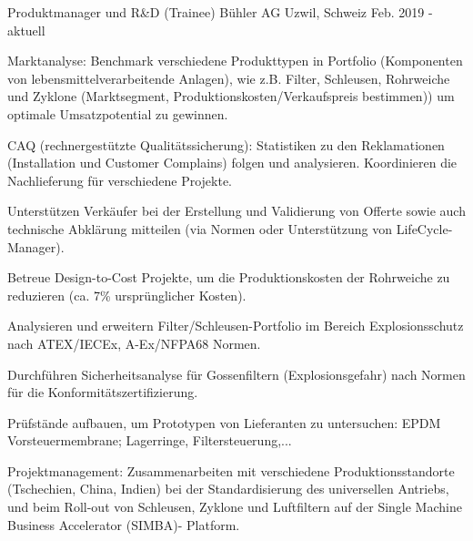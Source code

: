 

\begin{cventries}

\cventry
	{Produktmanager und R\&D (Trainee)} %
	{Bühler AG} %
	{Uzwil, Schweiz} %
	{Feb. 2019 - aktuell} %
	{
		\begin{cvitems} %
			\item {Marktanalyse: Benchmark verschiedene Produkttypen in Portfolio (Komponenten von lebensmittelverarbeitende Anlagen), wie z.B. Filter, Schleusen, Rohrweiche und Zyklone (Marktsegment, Produktionskosten/Verkaufspreis bestimmen)) um optimale Umsatzpotential zu gewinnen.}
			\item {CAQ (rechnergestützte Qualitätssicherung): Statistiken zu den Reklamationen (Installation und Customer Complains) folgen und analysieren. Koordinieren die Nachlieferung für verschiedene Projekte.}
			\item {Unterstützen Verkäufer bei der Erstellung und Validierung von Offerte sowie auch technische Abklärung mitteilen (via Normen oder Unterstützung von LifeCycle-Manager).}
			\item {Betreue Design-to-Cost Projekte, um die Produktionskosten der Rohrweiche zu reduzieren (ca. 7\% ursprünglicher Kosten).}
			\item {Analysieren und erweitern Filter/Schleusen-Portfolio im Bereich Explosionsschutz nach ATEX/IECEx, A-Ex/NFPA68 Normen.}
			\item {Durchführen Sicherheitsanalyse für Gossenfiltern (Explosionsgefahr) nach Normen für die Konformitätszertifizierung.}
			\item {Prüfstände aufbauen, um Prototypen von Lieferanten zu untersuchen: EPDM Vorsteuermembrane; Lagerringe, Filtersteuerung,...}
			\item {Projektmanagement: Zusammenarbeiten mit verschiedene Produktionsstandorte (Tschechien, China, Indien) bei der Standardisierung des universellen Antriebs, und beim Roll-out von Schleusen, Zyklone und Luftfiltern auf der Single Machine Business Accelerator (SIMBA)- Platform.}
		\end{cvitems}
}	



\end{cventries}
